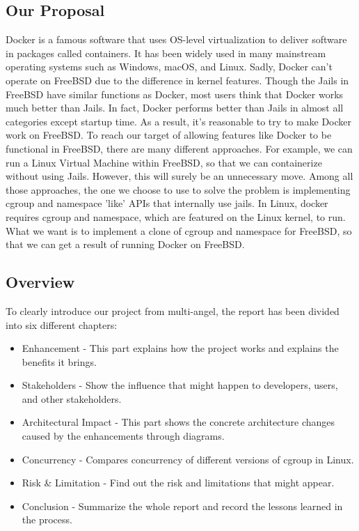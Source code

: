 \documentclass[12pt, dvipsnames, a4paper]{article}
\begin{document}
\subsection{Our Proposal}
Docker is a famous software that uses OS-level virtualization to deliver software in packages called containers. It has been widely used in many mainstream operating systems such as Windows, macOS, and Linux. Sadly, Docker can't operate on FreeBSD due to the difference in kernel features. Though the Jails in FreeBSD have similar functions as Docker, most users think that Docker works much better than Jails. In fact, Docker performs better than Jails in almost all categories except startup time. As a result, it's reasonable to try to make Docker work on FreeBSD.
To reach our target of allowing features like Docker to be functional in FreeBSD, there are many different approaches. For example, we can run a Linux Virtual Machine within FreeBSD, so that we can containerize without using Jails. However, this will surely be an unnecessary move. Among all those approaches, the one we choose to use to solve the problem is implementing cgroup and namespace 'like' APIs that internally use jails. In Linux, docker requires cgroup and namespace, which are featured on the Linux kernel, to run. What we want is to implement a clone of cgroup and namespace for FreeBSD, so that we can get a result of running Docker on FreeBSD.

\subsection{Overview}

To clearly introduce our project from multi-angel, the report has been divided into six different chapters:
\begin{itemize}
	\item Enhancement - This part explains how the project works and explains the benefits it brings.
	\item Stakeholders - Show the influence that might happen to developers, users, and other stakeholders.
	\item Architectural Impact - This part shows the concrete architecture changes caused by the enhancements through diagrams.
	\item Concurrency - Compares concurrency of different versions of cgroup in Linux.
	\item Risk \& Limitation - Find out the risk and limitations that might appear.
	\item Conclusion - Summarize the whole report and record the lessons learned in the process.
\end{itemize}
\clearpage
\end{document}
